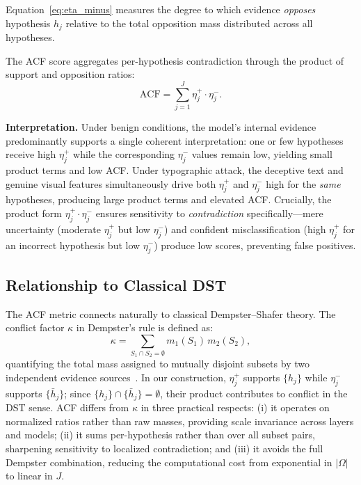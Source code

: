 \documentclass[preprint,12pt]{elsarticle}
\begin{document}
Equation~\eqref{eq:eta_minus} measures the degree to which evidence \emph{opposes} hypothesis $h_j$ relative to the total opposition mass distributed across all hypotheses.

The ACF score aggregates per-hypothesis contradiction through the product of support and opposition ratios:
\begin{equation}
\boxed{\text{ACF} = \sum_{j=1}^{J} \eta^+_j \cdot \eta^-_j.}
\label{eq:acf_final}
\end{equation}

\textbf{Interpretation.} Under benign conditions, the model's internal evidence predominantly supports a single coherent interpretation: one or few hypotheses receive high $\eta^+_j$ while the corresponding $\eta^-_j$ values remain low, yielding small product terms and low ACF. Under typographic attack, the deceptive text and genuine visual features simultaneously drive both $\eta^+_j$ and $\eta^-_j$ high for the \emph{same} hypotheses, producing large product terms and elevated ACF. Crucially, the product form $\eta^+_j \cdot \eta^-_j$ ensures sensitivity to \emph{contradiction} specifically---mere uncertainty (moderate $\eta^+_j$ but low $\eta^-_j$) and confident misclassification (high $\eta^+_j$ for an incorrect hypothesis but low $\eta^-_j$) produce low scores, preventing false positives.

\subsection{Relationship to Classical DST}

The ACF metric connects naturally to classical Dempster--Shafer theory. The conflict factor $\kappa$ in Dempster's rule is defined as:
\begin{equation}
\kappa = \sum_{S_1 \cap S_2 = \emptyset} m_1(S_1) \, m_2(S_2),
\end{equation}
quantifying the total mass assigned to mutually disjoint subsets by two independent evidence sources~\cite{dempster1967upper}. In our construction, $\eta^+_j$ supports $\{h_j\}$ while $\eta^-_j$ supports $\{\bar{h}_j\}$; since $\{h_j\} \cap \{\bar{h}_j\} = \emptyset$, their product contributes to conflict in the DST sense. ACF differs from $\kappa$ in three practical respects: (i) it operates on normalized ratios rather than raw masses, providing scale invariance across layers and models; (ii) it sums per-hypothesis rather than over all subset pairs, sharpening sensitivity to localized contradiction; and (iii) it avoids the full Dempster combination, reducing the computational cost from exponential in $|\Omega|$ to linear in $J$.
\end{document}
